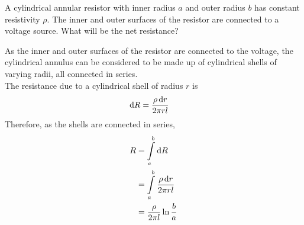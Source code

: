 \documentclass[fleqn, a4paper, 12pt, twoside]{article}
\theoremstyle{definition}
\theoremstyle{theorem}
\begin{document}
\begin{question}
	\begin{figure}[H]
	\end{figure}
	A cylindrical annular resistor with inner radius $a$ and outer radius $b$ has constant resistivity $\rho$.
	The inner and outer surfaces of the resistor are connected to a voltage source.
	What will be the net resistance?
\end{question}

\begin{solution}
	As the inner and outer surfaces of the resistor are connected to the voltage, the cylindrical annulus can be considered to be made up of cylindrical shells of varying radii, all connected in series.\\
	The resistance due to a cylindrical shell of radius $r$ is
	\begin{align*}
		\dif R & = \frac{\rho \dif r}{2 \pi r l}
	\end{align*}
	Therefore, as the shells are connected in series,
	\begin{align*}
		R & = \int\limits_{a}^{b} \dif R                        \\
                  & = \int\limits_{a}^{b} \frac{\rho \dif r}{2 \pi r l} \\
                  & = \frac{\rho}{2 \pi l} \ln \frac{b}{a}
	\end{align*}
\end{solution}
\end{document}
